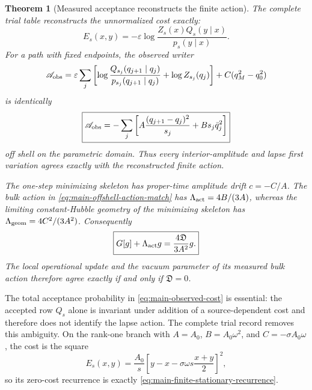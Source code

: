 \documentclass[11pt]{article}
\newtheorem{theorem}{Theorem}[section]
\theoremstyle{definition}
\theoremstyle{remark}
\begin{document}
\begin{theorem}[Measured acceptance reconstructs the finite action]
\label{thm:main-operational-action-matching}
The complete trial table reconstructs the unnormalized cost exactly:
\begin{equation}
 \boxed{
 E_s(x,y)=-\varepsilon\log
 \frac{Z_s(x)Q_s(y\mid x)}{p_s(y\mid x)}.}
 \label{eq:main-observed-cost}
\end{equation}
For a path with fixed endpoints, the observed writer
\begin{equation}
 \mathscr A_{\rm obs}
 =\varepsilon\sum_j\left[
 \log\frac{Q_{s_j}(q_{j+1}\mid q_j)}{p_{s_j}(q_{j+1}\mid q_j)}
 +\log Z_{s_j}(q_j)\right]
 +C(q_M^2-q_0^2)
 \label{eq:main-observed-homogeneous-action}
\end{equation}
is identically
\begin{equation}
 \boxed{
 \mathscr A_{\rm obs}
 =-\sum_j\left[A\frac{(q_{j+1}-q_j)^2}{s_j}
 +Bs_j\bar q_j^2\right]}
 \label{eq:main-offshell-action-match}
\end{equation}
off shell on the parametric domain.  Thus every interior-amplitude and lapse
first variation agrees exactly with the reconstructed finite action.

The one-step minimizing skeleton has proper-time amplitude drift
$c=-C/A$.  The bulk action in
\eqref{eq:main-offshell-action-match} has
$\Lambda_{\rm act}=4B/(3A)$, whereas the limiting constant-Hubble geometry of
the minimizing skeleton has
$\Lambda_{\rm geom}=4C^2/(3A^2)$.  Consequently
\begin{equation}
 \boxed{
 G[g]+\Lambda_{\rm act}g
 =\frac{4\mathfrak D}{3A^2}g.}
 \label{eq:main-measured-einstein-mismatch}
\end{equation}
The local operational update and the vacuum parameter of its measured bulk
action therefore agree exactly if and only if $\mathfrak D=0$.
\end{theorem}

The total acceptance probability in
\eqref{eq:main-observed-cost} is essential: the accepted row $Q_s$ alone is
invariant under addition of a source-dependent cost and therefore does not
identify the lapse action.  The complete trial record removes this ambiguity.
On the rank-one branch with $A=A_0$, $B=A_0\omega^2$, and
$C=-\sigma A_0\omega$, the cost is the square
\begin{equation}
 E_s(x,y)=\frac{A_0}{s}
 \left[y-x-\sigma\omega s\frac{x+y}{2}\right]^2,
 \label{eq:main-rank-one-cost}
\end{equation}
so its zero-cost recurrence is exactly
\eqref{eq:main-finite-stationary-recurrence}.
\end{document}
